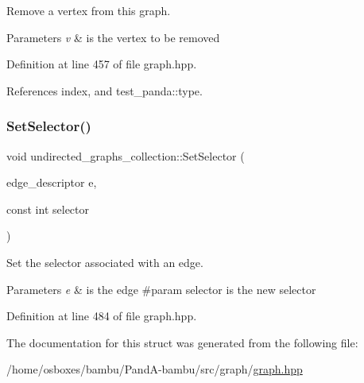 Remove a vertex from this graph. 


\begin{DoxyParams}{Parameters}
{\em v} & is the vertex to be removed \\
\hline
\end{DoxyParams}


Definition at line 457 of file graph.\+hpp.



References index, and test\+\_\+panda\+::type.

\mbox{\label{structundirected__graphs__collection_aa3154100fd670c092b828f244fec58e0}} 
\subsubsection{\texorpdfstring{Set\+Selector()}{SetSelector()}}
{\footnotesize\ttfamily void undirected\+\_\+graphs\+\_\+collection\+::\+Set\+Selector (\begin{DoxyParamCaption}\item[{edge\+\_\+descriptor}]{e,  }\item[{const int}]{selector }\end{DoxyParamCaption})\hspace{0.3cm}{\ttfamily [inline]}}



Set the selector associated with an edge. 


\begin{DoxyParams}{Parameters}
{\em e} & is the edge \#param selector is the new selector \\
\hline
\end{DoxyParams}


Definition at line 484 of file graph.\+hpp.



The documentation for this struct was generated from the following file\+:\begin{DoxyCompactItemize}
\item 
/home/osboxes/bambu/\+Pand\+A-\/bambu/src/graph/\hyperlink{graph_8hpp}{graph.\+hpp}\end{DoxyCompactItemize}
